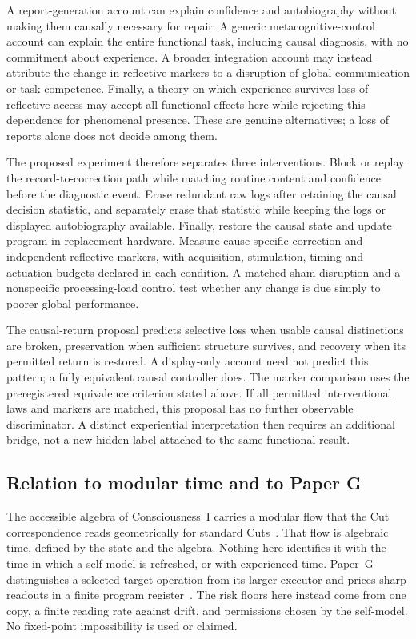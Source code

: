\documentclass[12pt]{article}
\theoremstyle{definition}
\theoremstyle{remark}
\begin{document}
A report-generation account can explain confidence and
autobiography without making them causally necessary for repair.
A generic metacognitive-control account can explain the entire
functional task, including causal diagnosis, with no commitment
about experience. A broader integration account may instead
attribute the change in reflective markers to a disruption of
global communication or task competence. Finally, a theory on
which experience survives loss of reflective access may accept
all functional effects here while rejecting this dependence for
phenomenal presence. These are genuine alternatives; a loss of
reports alone does not decide among them.

The proposed experiment therefore separates three interventions.
Block or replay the record-to-correction path while matching
routine content and confidence before the diagnostic event.
Erase redundant raw logs after retaining the causal decision
statistic, and separately erase that statistic while keeping
the logs or displayed autobiography available. Finally, restore
the causal state and update program in replacement hardware.
Measure cause-specific correction and independent reflective
markers, with acquisition, stimulation, timing and actuation
budgets declared in each condition. A matched sham disruption
and a nonspecific processing-load control test whether any
change is due simply to poorer global performance.

The causal-return proposal predicts selective loss when usable
causal distinctions are broken, preservation when sufficient
structure survives, and recovery when its permitted return is
restored. A display-only account need not predict this pattern;
a fully equivalent causal controller does. The marker comparison uses
the preregistered equivalence criterion stated above.
If all permitted interventional
laws and markers are matched, this proposal has no further
observable discriminator. A distinct experiential interpretation
then requires an additional bridge, not a new hidden label
attached to the same functional result.

\subsection{Relation to modular time and to Paper G}

The accessible algebra of Consciousness~I carries a modular flow that the Cut correspondence reads geometrically for standard Cuts~\cite{PaperI}. That flow is algebraic time, defined by the state and the algebra. Nothing here identifies it with the time in which a self-model is refreshed, or with experienced time. Paper~G distinguishes a selected target operation from its larger executor and prices sharp readouts in a finite program register~\cite{PaperG}. The risk floors here instead come from one copy, a finite reading rate against drift, and permissions chosen by the self-model. No fixed-point impossibility is used or claimed.
\end{document}
